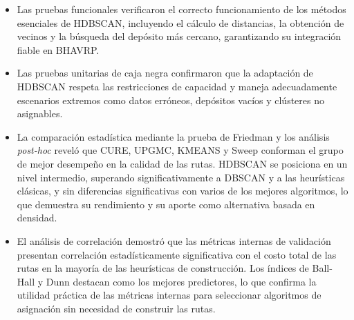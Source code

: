 \begin{itemize}
  \item Las pruebas funcionales verificaron el correcto funcionamiento de los m\'etodos esenciales de HDBSCAN, incluyendo el c\'alculo de distancias, la obtención de vecinos y la búsqueda del depósito más cercano, garantizando su integraci\'on fiable en BHAVRP.
  
  \item Las pruebas unitarias de caja negra confirmaron que la adaptaci\'on de HDBSCAN respeta las restricciones de capacidad y maneja adecuadamente escenarios extremos como datos err\'oneos, dep\'ositos vac\'ios y cl\'usteres no asignables.
  
  \item La comparaci\'on estad\'istica mediante la prueba de Friedman y los an\'alisis \textit{post-hoc} revel\'o que CURE, UPGMC, KMEANS y Sweep conforman el grupo de mejor desempe\~no en la calidad de las rutas. HDBSCAN se posiciona en un nivel intermedio, superando significativamente a DBSCAN y a las heur\'isticas cl\'asicas, y sin diferencias significativas con varios de los mejores algoritmos, lo que demuestra su rendimiento y su aporte como alternativa basada en densidad.
  
  \item El an\'alisis de correlaci\'on demostr\'o que las m\'etricas internas de validaci\'on presentan correlaci\'on estad\'isticamente significativa con el costo total de las rutas en la mayor\'ia de las heur\'isticas de construcci\'on. Los \'indices de Ball-Hall y Dunn destacan como los mejores predictores, lo que confirma la utilidad pr\'actica de las m\'etricas internas para seleccionar algoritmos de asignaci\'on sin necesidad de construir las rutas.
\end{itemize}